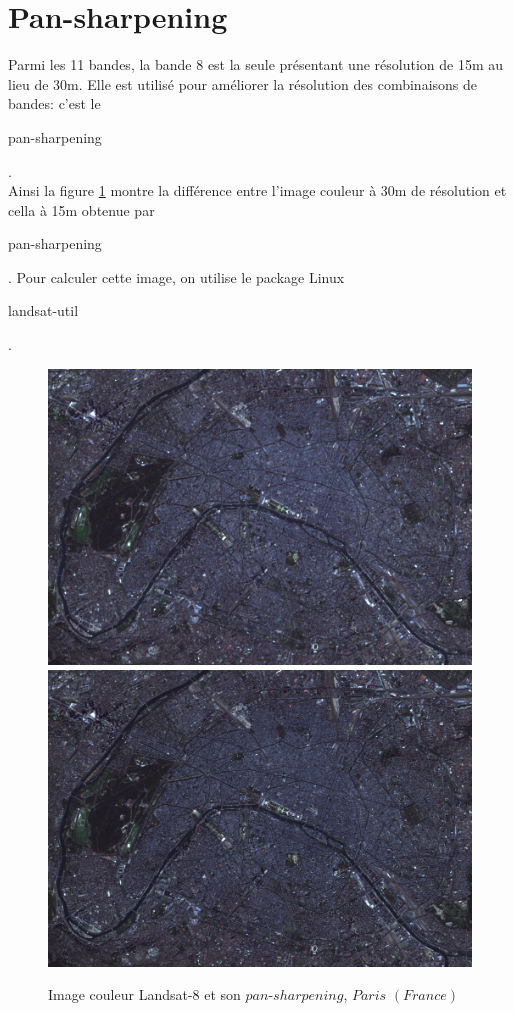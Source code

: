 \documentclass{book}
\begin{document}
\section{Pan-sharpening}

Parmi les 11 bandes, la bande 8 est la seule présentant une résolution de 15m au lieu de 30m. Elle est utilisé pour améliorer la résolution
des combinaisons de bandes: c'est le \begin{itshape}pan-sharpening\end{itshape}.\\
Ainsi la figure \ref{pan_sharpen} montre la différence entre l'image couleur à 30m de résolution et cella à 15m obtenue par \begin{itshape}pan-sharpening\end{itshape}.
Pour calculer cette image, on utilise le package Linux \begin{itshape}landsat-util\end{itshape} \cite{dans-gdal}.

\begin{figure}[H]
\begin{center}
\includegraphics[scale=0.4]{images/paris_rgb_zoom.png}
\includegraphics[scale=0.2]{images/paris_rgb_zoom_pansharpened.png}
\end{center}
\caption{Image couleur Landsat-8 et son $pan$-$sharpening$, $Paris$ $(France)$}
\label{pan_sharpen}
\end{figure}
\end{document}
